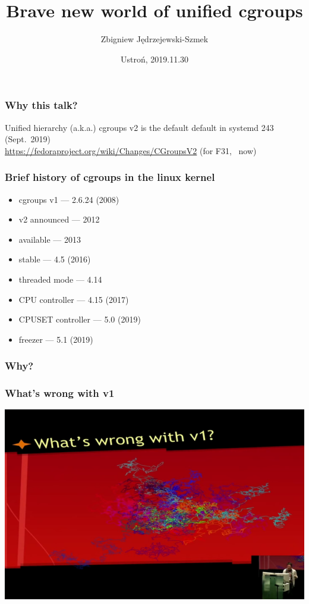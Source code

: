 \documentclass[serif]{beamer}
\title{Brave new world of unified cgroups}
\author{Zbigniew Jędrzejewski-Szmek}
\institute{%
  \texttt{[image: beamer-themeredhat/redhat.png]}\\
  \medskip
  \textit{zbyszek@in.waw.pl}\\
  \medskip
  \ccbysa
}
\date{\tiny Ustroń, 2019.11.30}
\begin{document}
\begin{frame}
\titlepage %
\end{frame}

\begin{frame}
  \frametitle{Why this talk?}
  \pause

  Unified hierarchy (a.k.a.) cgroups v2 is the default default in systemd 243 (Sept.\ 2019)\\[1em]
  \url{https://fedoraproject.org/wiki/Changes/CGroupsV2} (for F31, ~now)
\end{frame}

\begin{frame}
  \frametitle{Brief history of cgroups in the linux kernel}

  \begin{itemize}
  \item cgroups v1 — 2.6.24 (2008)
  \item v2 announced — 2012
  \item \phantom{v2} available — 2013
  \item \phantom{v2} stable — 4.5 (2016)
  \item threaded mode — 4.14
  \item CPU controller — 4.15 (2017)
  \item CPUSET controller — 5.0 (2019)
  \item freezer — 5.1 (2019)
  \end{itemize}
\end{frame}

\begin{frame}
  \frametitle{Why?}

\end{frame}

\begin{frame}
  \frametitle{What's wrong with v1}

  \includegraphics[width=\textwidth]{whats-wrong.png}
\end{frame}
\end{document}

